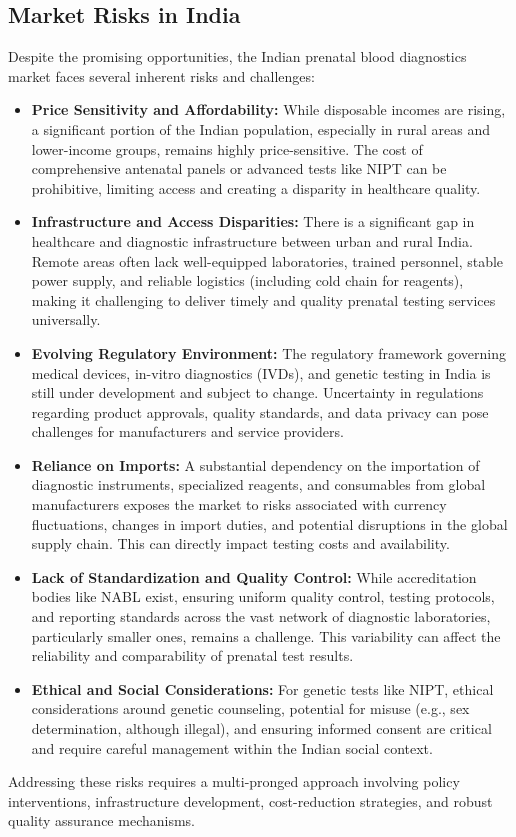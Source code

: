 \documentclass{article}
\begin{document}
{\subsection{Market Risks in India}

Despite the promising opportunities, the Indian prenatal blood diagnostics market faces several inherent risks and challenges:
\begin{itemize}
    \item \textbf{Price Sensitivity and Affordability:} While disposable incomes are rising, a significant portion of the Indian population, especially in rural areas and lower-income groups, remains highly price-sensitive. The cost of comprehensive antenatal panels or advanced tests like NIPT can be prohibitive, limiting access and creating a disparity in healthcare quality.
    \item \textbf{Infrastructure and Access Disparities:} There is a significant gap in healthcare and diagnostic infrastructure between urban and rural India. Remote areas often lack well-equipped laboratories, trained personnel, stable power supply, and reliable logistics (including cold chain for reagents), making it challenging to deliver timely and quality prenatal testing services universally.
    \item \textbf{Evolving Regulatory Environment:} The regulatory framework governing medical devices, in-vitro diagnostics (IVDs), and genetic testing in India is still under development and subject to change. Uncertainty in regulations regarding product approvals, quality standards, and data privacy can pose challenges for manufacturers and service providers.
    \item \textbf{Reliance on Imports:} A substantial dependency on the importation of diagnostic instruments, specialized reagents, and consumables from global manufacturers exposes the market to risks associated with currency fluctuations, changes in import duties, and potential disruptions in the global supply chain. This can directly impact testing costs and availability.
    \item \textbf{Lack of Standardization and Quality Control:} While accreditation bodies like NABL exist, ensuring uniform quality control, testing protocols, and reporting standards across the vast network of diagnostic laboratories, particularly smaller ones, remains a challenge. This variability can affect the reliability and comparability of prenatal test results.
    \item \textbf{Ethical and Social Considerations:} For genetic tests like NIPT, ethical considerations around genetic counseling, potential for misuse (e.g., sex determination, although illegal), and ensuring informed consent are critical and require careful management within the Indian social context.
\end{itemize}
Addressing these risks requires a multi-pronged approach involving policy interventions, infrastructure development, cost-reduction strategies, and robust quality assurance mechanisms.

}
\end{document}

